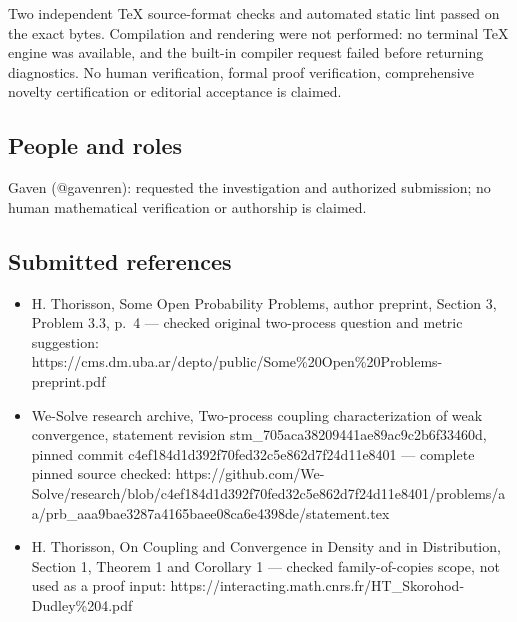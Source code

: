 \documentclass[11pt]{article}
\begin{document}
Two independent TeX source-format checks and automated static lint passed on the exact bytes. Compilation and rendering were not performed: no terminal TeX engine was available, and the built-in compiler request failed before returning diagnostics. No human verification, formal proof verification, comprehensive novelty certification or editorial acceptance is claimed.

\subsection{People and roles}

Gaven (@gavenren): requested the investigation and authorized submission; no human mathematical verification or authorship is claimed.

\subsection{Submitted references}

\begin{itemize}
\item
  H. Thorisson, Some Open Probability Problems, author preprint, Section 3, Problem 3.3, p.~4 --- checked original two-process question and metric suggestion: https://cms.dm.uba.ar/depto/public/Some\%20Open\%20Problems-preprint.pdf
\item
  We-Solve research archive, Two-process coupling characterization of weak convergence, statement revision stm\_705aca38209441ae89ac9c2b6f33460d, pinned commit c4ef184d1d392f70fed32c5e862d7f24d11e8401 --- complete pinned source checked: https://github.com/We-Solve/research/blob/c4ef184d1d392f70fed32c5e862d7f24d11e8401/problems/aa/prb\_aaa9bae3287a4165baee08ca6e4398de/statement.tex
\item
  H. Thorisson, On Coupling and Convergence in Density and in Distribution, Section 1, Theorem 1 and Corollary 1 --- checked family-of-copies scope, not used as a proof input: https://interacting.math.cnrs.fr/HT\_Skorohod-Dudley\%204.pdf
\end{itemize}
\end{document}
